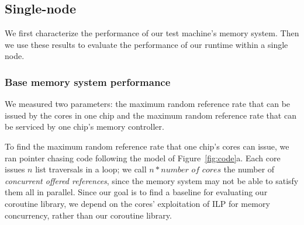 \documentclass[10pt,nocopyrightspace,preprint]{sigplanconf}
\begin{document}
{\subsection{Single-node}

We first characterize the performance of our test machine's memory
system. Then we use these results to evaluate the performance of our runtime within a single node.

\subsubsection{Base memory system performance}
\label{subsubsec:evalsinglebase}

We measured two parameters: the maximum random reference
rate that can be issued by the cores in one chip and the maximum random
reference rate that can be serviced by one chip's memory controller.

To find the maximum random reference rate that one chip's cores
can issue, we ran pointer chasing code following the model of
Figure~\ref{fig:code}a. Each core issues $n$ list traversals
in a loop; we call $n * \textit{number of cores}$ the number of
{\em concurrent offered references}, since the memory system may not
be able to satisfy them all in parallel. Since our goal is to find a
baseline for evaluating our coroutine library, we depend on the
cores' exploitation of ILP for memory concurrency, rather than our coroutine
library.

}
\end{document}

